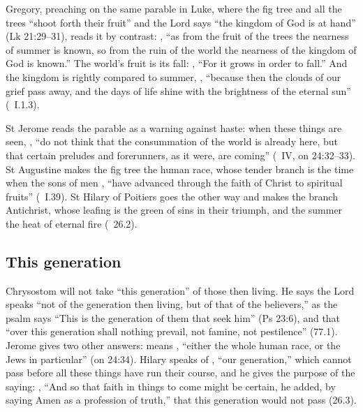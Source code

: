 Gregory, preaching on the same parable in Luke, where the fig tree and all the
trees ``shoot forth their fruit'' and the Lord says ``the kingdom of God is at
hand'' (Lk 21:29--31), reads it by contrast: , ``as from the fruit of the trees the nearness of summer is known, so from
the ruin of the world the nearness of the kingdom of God is known.'' The
world's fruit is its fall: , ``For it
grows in order to fall.'' And the kingdom is rightly compared to summer,
, ``because then the clouds of our grief pass away, and
the days of life shine with the brightness of the eternal sun''
(~I.1.3).

St Jerome reads the parable as a warning against haste: when these things are
seen, , ``do not think that the consummation of the
world is already here, but that certain preludes and forerunners, as it were,
are coming'' (~IV, on 24:32--33). St Augustine makes the fig
tree the human race, whose tender branch is the time when the sons of men
, ``have advanced
through the faith of Christ to spiritual fruits'' (~I.39). St Hilary of Poitiers goes the other way and makes the
branch Antichrist, whose leafing is the green of sins in their triumph, and the
summer the heat of eternal fire (~26.2).

\subsection{This generation}
\label{sec:words-generation}

Chrysostom will not take ``this generation'' of those then living. He says the
Lord speaks ``not of the generation then living, but of that of the believers,''
as the psalm says ``This is the generation of them that seek him'' (Ps 23:6),
and that ``over this generation shall nothing prevail, not famine, not
pestilence'' (77.1). Jerome gives two other answers:  means
, ``either the
whole human race, or the Jews in particular'' (on 24:34). Hilary speaks of
, ``our generation,'' which cannot pass before all
these things have run their course, and he gives the purpose of the saying:
, ``And so that faith in things to come might be certain,
he added, by saying Amen as a profession of truth,'' that this generation
would not pass (26.3).

